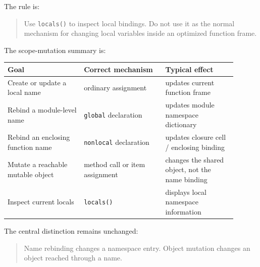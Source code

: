 The rule is:

\begin{quote}
Use \texttt{locals()} to inspect local bindings. Do not use it as the normal mechanism for changing local variables inside an optimized function frame.
\end{quote}

The scope-mutation summary is:

\begin{center}
\begin{tabular}{|p{0.30\linewidth}|p{0.32\linewidth}|p{0.28\linewidth}|}
\hline
\textbf{Goal} & \textbf{Correct mechanism} & \textbf{Typical effect} \\
\hline
Create or update a local name & ordinary assignment & updates current function frame \\
\hline
Rebind a module-level name & \texttt{global} declaration & updates module namespace dictionary \\
\hline
Rebind an enclosing function name & \texttt{nonlocal} declaration & updates closure cell / enclosing binding \\
\hline
Mutate a reachable mutable object & method call or item assignment & changes the shared object, not the name binding \\
\hline
Inspect current locals & \texttt{locals()} & displays local namespace information \\
\hline
\end{tabular}
\end{center}

The central distinction remains unchanged:

\begin{quote}
Name rebinding changes a namespace entry. Object mutation changes an object reached through a name.
\end{quote}